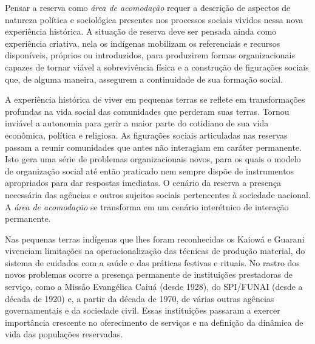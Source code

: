 Pensar a reserva como \emph{área de acomodação} requer a descrição de
aspectos de natureza política e sociológica presentes nos processos
sociais vividos nessa nova experiência histórica. A situação de reserva
deve ser pensada ainda como experiência criativa, nela os indígenas
mobilizam os referenciais e recursos disponíveis, próprios ou
introduzidos, para produzirem formas organizacionais capazes de tornar
viável a sobrevivência física e a construção de figurações sociais que,
de alguma maneira, assegurem a continuidade de sua formação social.

A experiência histórica de viver em pequenas terras se reflete em
transformações profundas na vida social das comunidades que perderam
suas terras. Tornou inviável a autonomia para gerir a maior parte do
cotidiano de sua vida econômica, política e religiosa. As figurações
sociais articuladas nas reservas passam a reunir comunidades que antes
não interagiam em caráter permanente. Isto gera uma série de problemas
organizacionais novos, para os quais o modelo de organização social até
então praticado nem sempre dispõe de instrumentos apropriados para dar
respostas imediatas. O cenário da reserva a presença necessária das
agências e outros sujeitos sociais pertencentes à sociedade nacional. A
\emph{área de acomodação} se transforma em um cenário interétnico de
interação permanente.

Nas pequenas terras indígenas que lhes foram reconhecidas os Kaiowá e
Guarani vivenciam limitações na operacionalização das técnicas de
produção material, do sistema de cuidados com a saúde e das práticas
festivas e rituais. No rastro dos novos problemas ocorre a presença
permanente de instituições prestadoras de serviço, como a Missão
Evangélica Caiuá (desde 1928), do SPI/FUNAI (desde a década de 1920) e,
a partir da década de 1970, de várias outras agências governamentais e
da sociedade civil. Essas instituições passaram a exercer importância
crescente no oferecimento de serviços e na definição da dinâmica de vida
das populações reservadas.

